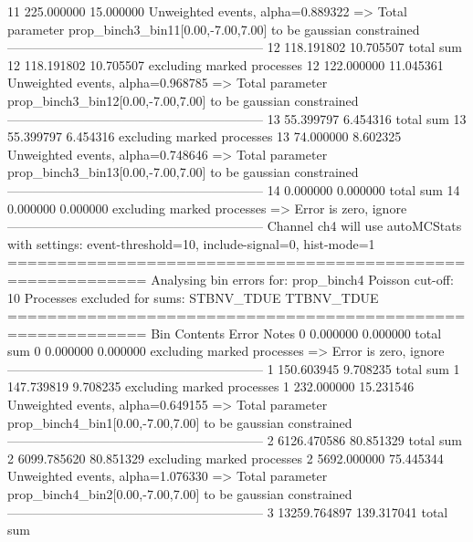11         225.000000      15.000000       Unweighted events, alpha=0.889322
  => Total parameter prop_binch3_bin11[0.00,-7.00,7.00] to be gaussian constrained
------------------------------------------------------------
12         118.191802      10.705507       total sum                     
12         118.191802      10.705507       excluding marked processes    
12         122.000000      11.045361       Unweighted events, alpha=0.968785
  => Total parameter prop_binch3_bin12[0.00,-7.00,7.00] to be gaussian constrained
------------------------------------------------------------
13         55.399797       6.454316        total sum                     
13         55.399797       6.454316        excluding marked processes    
13         74.000000       8.602325        Unweighted events, alpha=0.748646
  => Total parameter prop_binch3_bin13[0.00,-7.00,7.00] to be gaussian constrained
------------------------------------------------------------
14         0.000000        0.000000        total sum                     
14         0.000000        0.000000        excluding marked processes    
  => Error is zero, ignore      
------------------------------------------------------------
Channel ch4 will use autoMCStats with settings: event-threshold=10, include-signal=0, hist-mode=1
============================================================
Analysing bin errors for: prop_binch4
Poisson cut-off: 10
Processes excluded for sums: STBNV_TDUE TTBNV_TDUE
============================================================
Bin        Contents        Error           Notes                         
0          0.000000        0.000000        total sum                     
0          0.000000        0.000000        excluding marked processes    
  => Error is zero, ignore      
------------------------------------------------------------
1          150.603945      9.708235        total sum                     
1          147.739819      9.708235        excluding marked processes    
1          232.000000      15.231546       Unweighted events, alpha=0.649155
  => Total parameter prop_binch4_bin1[0.00,-7.00,7.00] to be gaussian constrained
------------------------------------------------------------
2          6126.470586     80.851329       total sum                     
2          6099.785620     80.851329       excluding marked processes    
2          5692.000000     75.445344       Unweighted events, alpha=1.076330
  => Total parameter prop_binch4_bin2[0.00,-7.00,7.00] to be gaussian constrained
------------------------------------------------------------
3          13259.764897    139.317041      total sum                     
